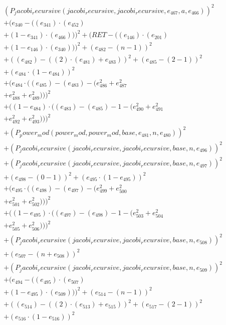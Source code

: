 \documentclass[10pt, a4paper]{article}
\begin{document}
\begin{align*}
& (P_jacobi_recursive(jacobi_recursive, jacobi_recursive, e_{467}, a, e_{466}))^{2} \\
& + (e_{340} - ((e_{341})  \cdot  (e_{452}) \\
& + (1 - e_{341})  \cdot  (e_{466})))^{2} + (RET - ((e_{146})  \cdot  (e_{201}) \\
& + (1 - e_{146})  \cdot  (e_{340})))^{2} + (e_{482} - (n - 1))^{2} \\
& + ((e_{482}) - ((2)  \cdot  (e_{481}) + e_{483}))^{2} + (e_{485} - (2 - 1))^{2} \\
& + (e_{484}  \cdot  (1 - e_{484}))^{2} \\
& + (e_{484}  \cdot  ((e_{485}) - (e_{483}) - (e_{486}^{2} + e_{487}^{2} \\
& + e_{488}^{2} + e_{489}^{2})))^{2} \\
& + ((1 - e_{484})  \cdot  ((e_{483}) - (e_{485}) - 1 - (e_{490}^{2} + e_{491}^{2} \\
& + e_{492}^{2} + e_{493}^{2})))^{2} \\
& + (P_power_mod(power_mod, power_mod, base, e_{481}, n, e_{480}))^{2} \\
& + (P_jacobi_recursive(jacobi_recursive, jacobi_recursive, base, n, e_{496}))^{2} \\
& + (P_jacobi_recursive(jacobi_recursive, jacobi_recursive, base, n, e_{497}))^{2} \\
& + (e_{498} - (0 - 1))^{2} + (e_{495}  \cdot  (1 - e_{495}))^{2} \\
& + (e_{495}  \cdot  ((e_{498}) - (e_{497}) - (e_{499}^{2} + e_{500}^{2} \\
& + e_{501}^{2} + e_{502}^{2})))^{2} \\
& + ((1 - e_{495})  \cdot  ((e_{497}) - (e_{498}) - 1 - (e_{503}^{2} + e_{504}^{2} \\
& + e_{505}^{2} + e_{506}^{2})))^{2} \\
& + (P_jacobi_recursive(jacobi_recursive, jacobi_recursive, base, n, e_{508}))^{2} \\
& + (e_{507} - (n + e_{508}))^{2} \\
& + (P_jacobi_recursive(jacobi_recursive, jacobi_recursive, base, n, e_{509}))^{2} \\
& + (e_{494} - ((e_{495})  \cdot  (e_{507}) \\
& + (1 - e_{495})  \cdot  (e_{509})))^{2} + (e_{514} - (n - 1))^{2} \\
& + ((e_{514}) - ((2)  \cdot  (e_{513}) + e_{515}))^{2} + (e_{517} - (2 - 1))^{2} \\
& + (e_{516}  \cdot  (1 - e_{516}))^{2} \\

\end{align*}
\end{document}
